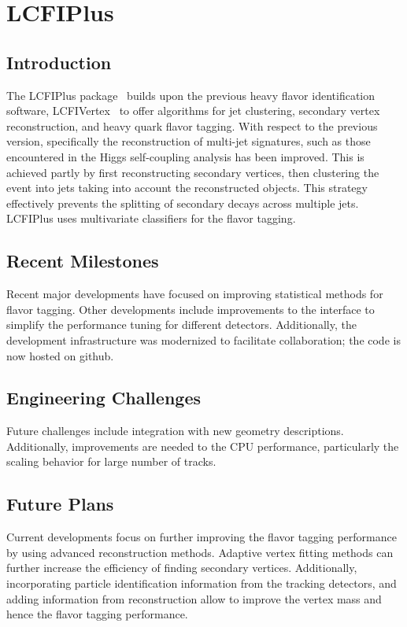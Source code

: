 \section{LCFIPlus}

\subsection{Introduction}
The LCFIPlus package~\cite{Suehara:2015ura} builds upon the previous heavy flavor identification software, LCFIVertex~\cite{Bailey:2009ui} to offer algorithms for jet clustering, secondary vertex reconstruction, and heavy quark flavor tagging. With respect to the previous version, specifically the reconstruction of multi-jet signatures, such as those encountered in the Higgs self-coupling analysis has been improved. This is achieved partly by first reconstructing secondary vertices, then clustering the event into jets taking into account the reconstructed objects. This strategy effectively prevents the splitting of secondary decays across multiple jets. LCFIPlus uses multivariate classifiers for the flavor tagging.

\subsection{Recent Milestones}
Recent major developments have focused on improving statistical methods for flavor tagging. Other developments include improvements to the interface to simplify the performance tuning for different detectors.
Additionally, the development infrastructure was modernized to facilitate collaboration; the code is now hosted on github.

\subsection{Engineering Challenges}
Future challenges include integration with new geometry descriptions. Additionally, improvements are needed to the CPU performance, particularly the scaling behavior for large number of tracks.

\subsection{Future Plans}
Current developments focus on further improving the flavor tagging performance by using advanced reconstruction methods. Adaptive vertex fitting methods can further increase the efficiency of finding secondary vertices. Additionally, incorporating particle identification information from the tracking detectors, and adding information from \Ppizero reconstruction allow to improve the vertex mass and hence the flavor tagging performance.
